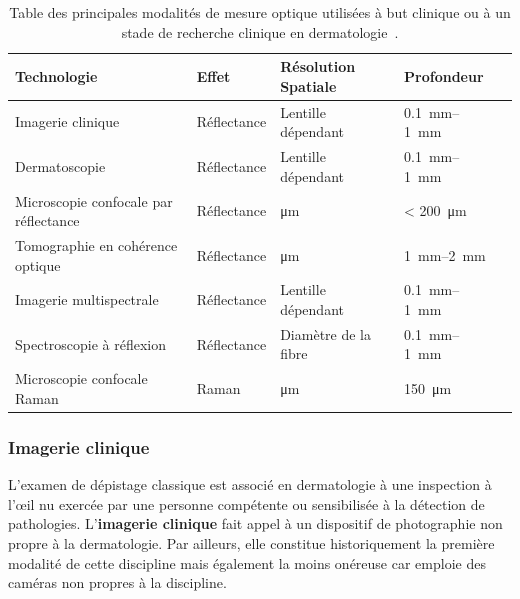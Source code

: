 \begin{table}[H]
\begin{tabular}{lllll}
    \toprule
    \textbf{Technologie}                        & \textbf{Effet}    & \textbf{Résolution Spatiale} & \textbf{Profondeur}                \\ \hline
    Imagerie clinique                           & Réflectance       & Lentille dépendant           & \SIrange{0.1}{1}{\milli\metre}     \\
    Dermatoscopie                               & Réflectance       & Lentille dépendant           & \SIrange{0.1}{1}{\milli\metre}     \\
    Microscopie confocale par réflectance       & Réflectance       & \si{\micro\metre}            & \textless{} \SI{200}{\micro\metre} \\
    Tomographie en cohérence optique            & Réflectance       & \si{\micro\metre}            & \SIrange{1}{2}{\milli\metre}       \\
    Imagerie multispectrale                     & Réflectance       & Lentille dépendant           & \SIrange{0.1}{1}{\milli\metre}     \\
    Spectroscopie à réflexion                   & Réflectance       & Diamètre de la fibre         & \SIrange{0.1}{1}{\milli\metre}     \\
    Microscopie confocale Raman                 & Raman             & \si{\micro\metre}            & \SI{150}{\micro\metre}             \\
    \bottomrule
\end{tabular}
\caption{Table des principales modalités de mesure optique utilisées à but clinique ou à un stade de recherche clinique en dermatologie~\cite{Kollias2002}.}
\label{tab:light_absorption}
\end{table}\par

\subsubsection{Imagerie clinique}
L’examen de dépistage classique est associé en dermatologie à une inspection à l’œil nu exercée par une personne compétente ou sensibilisée à la détection de pathologies. L'\textbf{imagerie clinique} fait appel à un dispositif de photographie non propre à la dermatologie. Par ailleurs, elle constitue historiquement la première modalité de cette discipline mais également la moins onéreuse car emploie des caméras non propres à la discipline.\par

